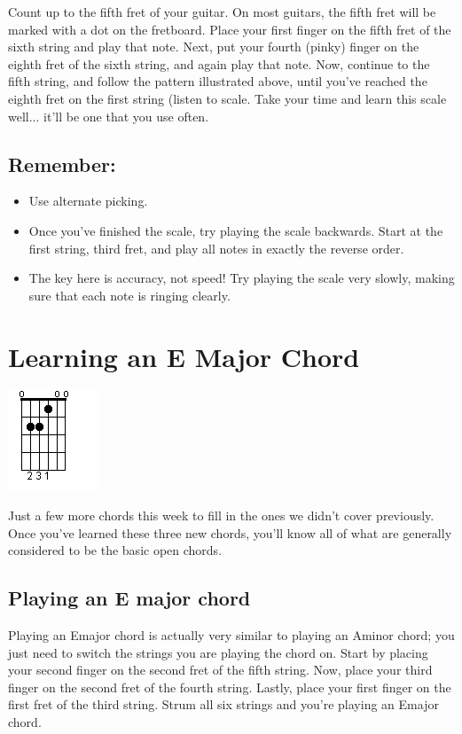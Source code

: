 Count up to the fifth fret of your guitar. On most guitars, the fifth fret will be marked with a dot on the fretboard. Place your first finger on the fifth fret of the sixth string and play that note. Next, put your fourth (pinky) finger on the eighth fret of the sixth string, and again play that note. Now, continue to the fifth string, and follow the pattern illustrated above, until you've reached the eighth fret on the first string (listen to scale. Take your time and learn this scale well... it'll be one that you use often.

\subsection{Remember:}
\begin{itemize}
\item Use alternate picking.
\item Once you've finished the scale, try playing the scale backwards. Start at the first string, third fret, and play all notes in exactly the reverse order.
\item The key here is accuracy, not speed! Try playing the scale very slowly, making sure that each note is ringing clearly.
\end{itemize}

\section{Learning an E Major Chord}
\includegraphics{partthree/openemajor.png}

Just a few more chords this week to fill in the ones we didn't cover previously. Once you've learned these three new chords, you'll know all of what are generally considered to be the basic open chords.

\subsection{Playing an E major chord}

Playing an Emajor chord is actually very similar to playing an Aminor chord; you just need to switch the strings you are playing the chord on. Start by placing your second finger on the second fret of the fifth string. Now, place your third finger on the second fret of the fourth string. Lastly, place your first finger on the first fret of the third string. Strum all six strings and you're playing an Emajor chord.

